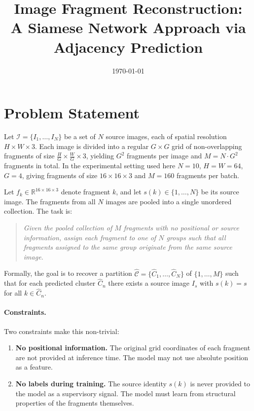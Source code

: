 \documentclass[12pt, a4paper]{article}
\title{Image Fragment Reconstruction:\\
A Siamese Network Approach via Adjacency Prediction}
\author{}
\date{\today}
\begin{document}
\maketitle
\tableofcontents
\newpage

\section{Problem Statement}

Let $\mathcal{I} = \{I_1, \dots, I_N\}$ be a set of $N$ source images, each of spatial
resolution $H \times W \times 3$. Each image is divided into a regular $G \times G$ grid
of non-overlapping fragments of size $\frac{H}{G} \times \frac{W}{G} \times 3$, yielding
$G^2$ fragments per image and $M = N \cdot G^2$ fragments in total. In the experimental
setting used here $N = 10$, $H = W = 64$, $G = 4$, giving fragments of size
$16 \times 16 \times 3$ and $M = 160$ fragments per batch.

Let $f_k \in \mathbb{R}^{16 \times 16 \times 3}$ denote fragment $k$, and let
$s(k) \in \{1, \dots, N\}$ be its source image. The fragments from all $N$ images are
pooled into a single unordered collection. The task is:

\begin{quote}
\textit{Given the pooled collection of $M$ fragments with no positional or source
information, assign each fragment to one of $N$ groups such that all fragments assigned
to the same group originate from the same source image.}
\end{quote}

Formally, the goal is to recover a partition $\hat{\mathcal{C}} = \{\hat{C}_1, \dots,
\hat{C}_N\}$ of $\{1, \dots, M\}$ such that for each predicted cluster $\hat{C}_n$ there
exists a source image $I_{s}$ with $s(k) = s$ for all $k \in \hat{C}_n$.

\paragraph{Constraints.}
Two constraints make this non-trivial:

\begin{enumerate}
    \item \textbf{No positional information.} The original grid coordinates of each
          fragment are not provided at inference time. The model may not use absolute
          position as a feature.
    \item \textbf{No labels during training.} The source identity $s(k)$ is never
          provided to the model as a supervisory signal. The model must learn from
          structural properties of the fragments themselves.
\end{enumerate}
\end{document}
